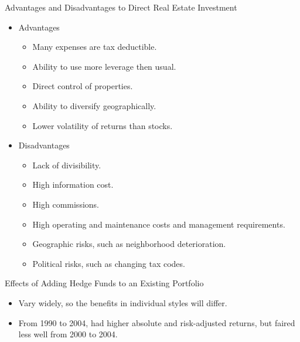 \documentclass[../custom]{flashcards}
\begin{document}
\begin{flashcard}[\studyArea]{Advantages and Disadvantages to Direct Real Estate Investment}
    \begin{itemize}
        \item Advantages
        \begin{itemize}
            \item Many expenses are tax deductible.
            \item Ability to use more leverage then usual.
            \item Direct control of properties.
            \item Ability to diversify geographically.
            \item Lower volatility of returns than stocks.
        \end{itemize}
        \item Disadvantages
        \begin{itemize}
            \item Lack of divisibility.
            \item High information cost.
            \item High commissions.
            \item High operating and maintenance costs and management requirements.
            \item Geographic risks, such as neighborhood deterioration.
            \item Political risks, such as changing tax codes.
        \end{itemize}
    \end{itemize}
\end{flashcard}

\begin{flashcard}[\studyArea]{Effects of Adding Hedge Funds to an Existing Portfolio}
    \begin{itemize}
        \item Vary widely, so the benefits in individual styles will differ.
        \item From 1990 to 2004, had higher absolute and risk-adjusted returns, but faired less well from 2000 to 2004.
    \end{itemize}
\end{flashcard}
\end{document}
